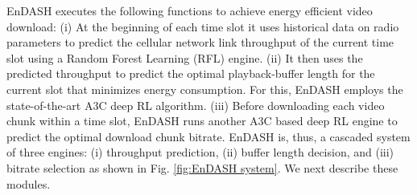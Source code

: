 EnDASH executes the following functions to achieve energy efficient video download: (i) At the beginning of each time slot it uses historical data on radio parameters to predict the cellular network link throughput of the current time slot using a Random Forest Learning (RFL) engine. (ii) It then uses the predicted throughput to predict the optimal playback-buffer length for the current slot that minimizes energy consumption. For this, EnDASH employs the state-of-the-art \ac{A3C} deep \ac{RL} algorithm.  (iii) Before downloading each video chunk within a time slot, EnDASH runs another A3C based deep \ac{RL} engine to predict the optimal download chunk  bitrate. 
 EnDASH is, thus, a cascaded system of three engines: (i) throughput prediction, (ii) buffer length decision,  and (iii) bitrate selection as shown in Fig. \ref{fig:EnDASH system}. We next describe these modules.%
